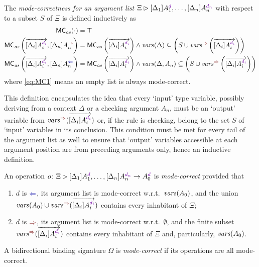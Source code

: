 \begin{definition}\label{def:mode-correctness}
  The \emph{mode-correctness for an argument list} $\Xi \rhd [\Delta_{1}] A_{1}^{\dir{d}}, \ldots, [\Delta_n]A_{n}^{\dir{d_n}}$  with respect to a subset $S$ of $\Xi$ is defined inductively as
  \begin{align}
    \label{eq:MC1} \MC_{\mathit{as}}( \cdot ) & = \top \\
    \label{eq:MC2} \MC_{\mathit{as}}\left(\overrightarrow{[\Delta_i]A_i^{\dir{d_i}}}, [\Delta_{n}]A_{n}^{\syn}\right) 
    & = \MC_{\mathit{as}}\left(\overrightarrow{[\Delta_i]A_i^{\dir{d_i}}}\right)
    \land \fv(\Delta) \subseteq \left( S \cup \synvar\left(\overrightarrow{[\Delta_i]A_i^{\dir{d_i}}}\right) \right)\\
    \label{eq:MC3} \MC_{\mathit{as}}\left(\overrightarrow{[\Delta_i]A_i^{\dir{d_i}}}, [\Delta_{n}]A_{n}^{\chk}\right)
    & = \MC_{\mathit{as}}\left(\overrightarrow{[\Delta_i]A_i^{\dir{d_i}}}\right)
    \land \fv(\Delta, A_n) \subseteq \left( S \cup \synvar\left(\overrightarrow{[\Delta_i]A_i^{\dir{d_i}}}\right)\right)
  \end{align}
  where \eqref{eq:MC1} means an empty list is always mode-correct.
\end{definition}
This definition encapsulates the idea that every `input' type variable, possibly deriving from a context $\Delta$ or a checking argument $A_n$, must be an `output' variable from $\synvar(\overrightarrow{[\Delta_i]A_i^{\dir{d_i}}})$ or, if the rule is checking, belong to the set $S$ of `input' variables in its conclusion.
This condition must be met for every tail of the argument list as well to ensure that `output' variables accessible at each argument position are from preceding arguments only, hence an inductive definition.
\begin{definition}
  An operation $o\colon \Xi \rhd [\Delta_{1}] A_{1}^{\dir{d}}, \ldots, [\Delta_n]A_{n}^{\dir{d_n}} \to A_0^{\dir{d}}$ is \emph{mode-correct} provided that
  \begin{enumerate}
    \item $d$ is $\chk$, its argument list is mode-correct w.r.t.\ $\mathit{vars}(A_0)$, and the union $\fv(A_0) \cup \synvar(\overrightarrow{[\Delta_i]A_i^{\dir{d_i}}})$ contains every inhabitant of $\Xi$;
    \item $d$ is $\syn$, its argument list is mode-correct w.r.t.\ $\emptyset$, and the finite subset $\synvar(\overrightarrow{[\Delta_i]A_i^{\dir{d_i}}})$ contains every inhabitant of $\Xi$ and, particularly, $\mathit{vars}(A_0)$.
  \end{enumerate}
  A bidirectional binding signature $\Omega$ is \emph{mode-correct} if its operations are all mode-correct.
\end{definition}
